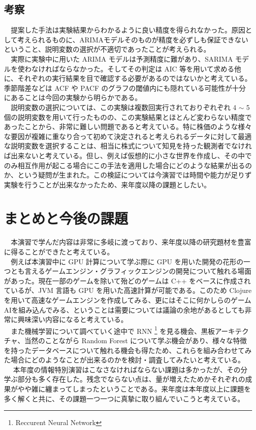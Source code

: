 \documentclass{scrartcl}
\begin{document}
\subsection{考察}
\label{sec:orgf96ec5c}
　提案した手法は実験結果からわかるように良い精度を得られなかった。原因として考えられるものに、ARIMAモデルそのものが精度を必ずしも保証できないということ、説明変数の選択が不適切であったことが考えられる。\\
　実際に実験中に用いた ARIMA モデルは予測精度に難があり、SARIMA モデルを使わなければならなかった。そしてその判定は AIC 等を用いて求める他に、それぞれの実行結果を目で確認する必要があるのではないかと考えている。季節階差などは ACF や PACF のグラフの閾値内にも隠れている可能性が十分にあることは今回の実験から明らかである。\\
　説明変数の選択については、この実験は複数回実行されておりぞれぞれ 4 \(\sim\) 5 個の説明変数を用いて行ったものの、この実験結果とほとんど変わらない精度であったことから、非常に難しい問題であると考えている。特に株価のような様々な要因が複雑に重なり合って初めて決定されると考えられるデータに対して最適な説明変数を選択することは、相当に株式について知見を持った観測者でなければ出来ないと考えている。但し、例えば仮想的に小さな世界を作成し、その中でのみ相互作用が起こる場合にこの手法を適用した場合にどのような結果が出るのか、という疑問が生まれた。この検証については今演習では時間や能力が足りず実験を行うことが出来なかったため、来年度以降の課題としたい。\\
\section{まとめと今後の課題}
\label{sec:org0f59b9f}
　本演習で学んだ内容は非常に多岐に渡っており、来年度以降の研究題材を豊富に得ることができたと考えている。\\
　例えば本演習中に GPU 計算について学ぶ際に GPU を用いた開発の花形の一つとも言えるゲームエンジン・グラフィックエンジンの開発について触れる場面があった。現在一部のゲームを除いて殆どのゲームは C++ をベースに作成されているが、JVM 言語も GPU を用いた高速計算が可能である。このため Clojure を用いて高速なゲームエンジンを作成してみる、更にはそこに何かしらのゲームAIを組み込んでみる、ということは需要については議論の余地があるとしても非常に興味深い内容になると考えている。\\
　また機械学習について調べていく途中で RNN \footnote{Reccurent Neural Network} を見る機会、黒板アーキテクチャ、当然のことながら Random Forest について学ぶ機会があり、様々な特徴を持ったデータベースについて触れる機会も得たため、これらを組み合わせてみた場合にどのようなことが出来るのかを検討・調査してみたいと考えている。\\
　 本年度の情報特別演習はこなさなければならない課題は多かったが、その分学ぶ部分も多く存在した。残念でならない点は、量が増えたためかそれぞれの成果がやや雑に纏まってしまったということである。来年度は本年度以上に課題を多く解くと共に、その課題一つ一つに真摯に取り組んでいこうと考えている。\\
\end{document}
